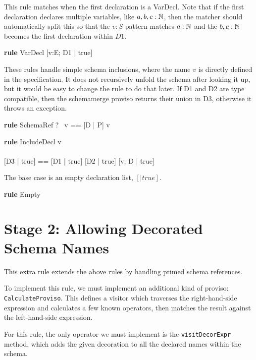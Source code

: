 \documentclass{article}
\newenvironment{zedrule}[1]{\par\textbf{rule }#1\vspace{-1ex}\infrule}{\endinfrule}
\newcommand{\derives}{\derive{}}
\newcommand{\proviso}{\raisebox{0.5ex}{${}_{\blacktriangleright}\ $}}%
\newcommand{\schemamerge}{\mathbin{\textbf{schemamerge}}}
\begin{document}
This rule matches when the first declaration is a VarDecl.
Note that if the first declaration declares multiple variables,
like $a,b,c:{\mathbb N}$, then the matcher should automatically split this
so that the $v:S$ pattern matches $a:{\mathbb N}$ and the $b,c:{\mathbb N}$
becomes the first declaration within $D1$.
\begin{zedrule}{VarDecl}
   [D1 | true] \unfoldsTo [D2 | P2]
\derives
   [v:E; D1 | true] \unfoldsTo [v:E; D2 | P2]
\end{zedrule}

These rules handle simple schema inclusions, where the name
$v$ is directly defined in the specification.  It does not
recursively unfold the schema after looking it up, but it would
be easy to change the rule to do that later.  If D1 and D2 are 
type compatible, then the schemamerge proviso returns their
union in D3, otherwise it throws an exception.

\begin{zedrule}{SchemaRef}
  \proviso ?~ v == [D | P]
\derives
  v \unfoldsTo [D | P]
\end{zedrule}


\begin{zedrule}{IncludeDecl}
   v \unfoldsTo [D1 | P1] \\
   [D | true] \unfoldsTo [D2 | P2] \\
   \proviso [D3 | true] == [D1 | true] \schemamerge [D2 | true]
\derives
   [v; D | true] \unfoldsTo [D3 | P1 \land P2]
\end{zedrule}

The base case is an empty declaration list, $[|true]$.
\begin{zedrule}{Empty}
   [~ | true] \unfoldsTo [~ | true]
\end{zedrule}


\section*{Stage 2: Allowing Decorated Schema Names}

This extra rule extends the above rules by handling primed schema
references.

To implement this rule, we must implement an additional kind of
proviso: \verb!CalculateProviso!.  This defines a visitor which
traverses the right-hand-side expression and calculates a few known
operators, then matches the result against the left-hand-side expression.

For this rule, the only operator we must implement is the
\verb!visitDecorExpr! method, which adds the given decoration to all the
declared names within the schema.
\end{document}
